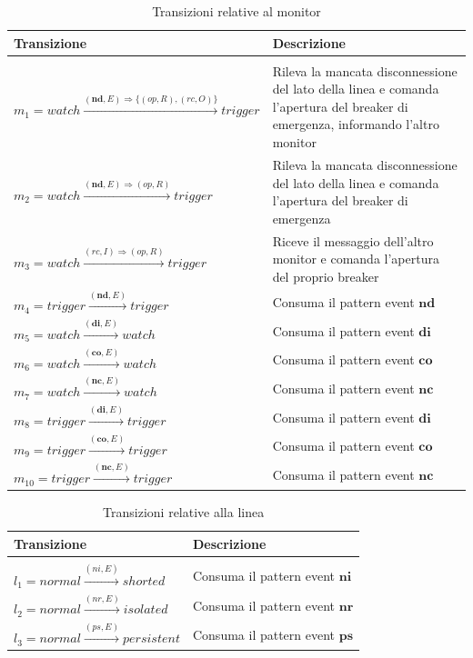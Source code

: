 \begin{table}[htbp] 
\begin{tabularx}{\textwidth}{l X}
\hline
\textbf{Transizione} & \textbf{Descrizione}\\
\hline\\
$m_1 = watch \xrightarrow{(\textbf{nd},E) \Rightarrow \{(op,R),(rc,O)\}} trigger$ & Rileva la mancata disconnessione del lato della linea e comanda l'apertura del breaker di emergenza, informando l'altro monitor\\[1mm]
$m_2 = watch \xrightarrow{(\textbf{nd},E) \Rightarrow (op,R)} trigger$ & Rileva la mancata disconnessione del lato della linea e comanda l'apertura del breaker di emergenza\\[1mm]
$m_3 = watch \xrightarrow{(rc,I) \Rightarrow (op,R)} trigger$ & Riceve il messaggio dell'altro monitor e comanda l'apertura del proprio breaker\\[1mm]
$m_4 = trigger \xrightarrow{(\textbf{nd},E)} trigger$ & Consuma il pattern event $\textbf{nd}$\\[1mm]
$m_5 = watch \xrightarrow{(\textbf{di},E)} watch$ & Consuma il pattern event $\textbf{di}$\\[1mm]
$m_6 = watch \xrightarrow{(\textbf{co},E)} watch$ & Consuma il pattern event $\textbf{co}$\\[1mm]
$m_7 = watch \xrightarrow{(\textbf{nc},E)} watch$ & Consuma il pattern event $\textbf{nc}$\\[1mm]
$m_8 = trigger \xrightarrow{(\textbf{di},E)} trigger$ & Consuma il pattern event $\textbf{di}$\\[1mm]
$m_9 = trigger \xrightarrow{(\textbf{co},E)} trigger$ & Consuma il pattern event $\textbf{co}$\\[1mm]
$m_{10} = trigger \xrightarrow{(\textbf{nc},E)} trigger$ & Consuma il pattern event $\textbf{nc}$\\[1mm]
\hline
\end{tabularx}
\caption{Transizioni relative al monitor}
\label{tab:m_trans}
\end{table}

\begin{table}[htbp] 
\begin{tabularx}{\textwidth}{l X}
\hline
\textbf{Transizione} & \textbf{Descrizione}\\
\hline\\
$l_1 = normal \xrightarrow{(ni,E)} shorted$ & Consuma il pattern event $\textbf{ni}$\\[1mm]
$l_2 = normal \xrightarrow{(nr,E)} isolated$ & Consuma il pattern event $\textbf{nr}$\\[1mm]
$l_3 = normal \xrightarrow{(ps,E)} persistent$ & Consuma il pattern event $\textbf{ps}$\\[1mm]
\hline
\end{tabularx}
\caption{Transizioni relative alla linea}
\label{tab:l_trans}
\end{table}

